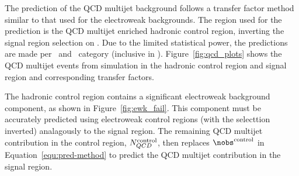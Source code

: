 The prediction of the QCD multijet background follows a transfer factor method
similar to that used for the electroweak backgrounds. The region used
for the prediction is the QCD multijet enriched hadronic control region, 
inverting the signal region selection on \mhtmet. Due to the limited statistical
power, the predictions are made per \njet~and \scalht~category (inclusive in \nb).
Figure~\ref{fig:qcd_plots} shows the QCD multijet events from simulation 
in the hadronic control region and signal region and corresponding transfer factors.

The hadronic control region contains a significant electroweak background component, 
as shown in Figure~\ref{fig:ewk_fail}. This component must be accurately predicted
using electroweak control regions (with the \mhtmet selecttion inverted) analagously 
to the signal region. The remaining QCD multijet contribution in the control region,
$N_{QCD}^{\rm control}$, then replaces $\nobs^{\rm control}$ in Equation~\ref{equ:pred-method} 
to predict the QCD multijet contribution in the signal region. 


